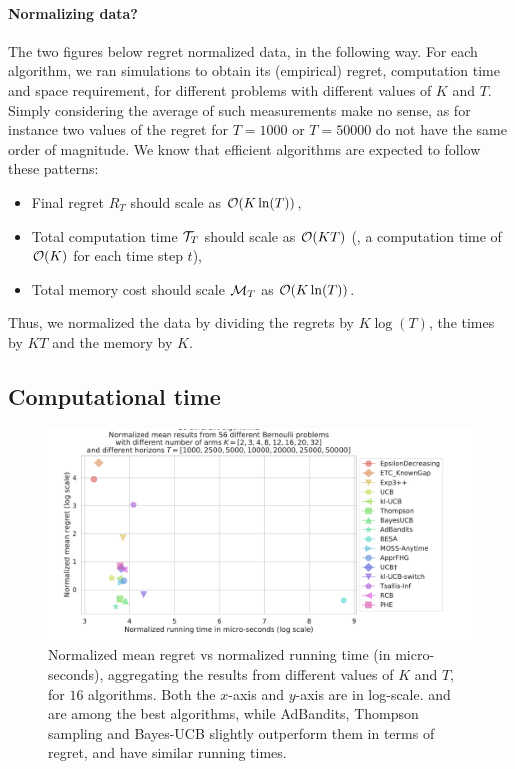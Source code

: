 \paragraph{Normalizing data?}

The two figures below regret normalized data, in the following way.
For each algorithm, we ran simulations to obtain its (empirical) regret, computation time and space requirement, for different problems with different values of $K$ and $T$.
Simply considering the average of such measurements make no sense, as for instance two values of the regret for $T=1000$ or $T=50000$ do not have the same order of magnitude.
%
We know that efficient algorithms are expected to follow these patterns:
\begin{itemize}
    \item Final regret $R_T$ should scale as $\mathcal{O}(K \ln(T))$,
    \item Total computation time $\mathcal{T}_T$ should scale as $\mathcal{O}(K T)$ (\ie, a computation time of $\mathcal{O}(K)$ for each time step $t$),
    \item Total memory cost should scale $\mathcal{M}_T$ as $\mathcal{O}(K \ln(T))$.
\end{itemize}
Thus, we normalized the data by dividing the regrets by $K \log(T)$, the times by $K T$ and the memory by $K$.


\subsection{Computational time}


\begin{figure}[h!]  %
	\includegraphics[width=1.05\linewidth]{16_different_algorithms__lognormregret_vs_lognormtime__56pb__7KS_7Ts.pdf}
	\caption[Normalized mean regret vs normalized running time (in micro-seconds).]{
        Normalized mean regret vs normalized running time (in micro-seconds),
        aggregating the results from different values of $K$ and $T$, for $16$ algorithms.
        Both the $x$-axis and $y$-axis are in log-scale.
        \UCB{} and \klUCB{} are among the best algorithms, while AdBandits, Thompson sampling and Bayes-UCB slightly outperform them in terms of regret, and have similar running times.
	}
	\label{fig:3:16_different_algorithms__lognormregret_vs_lognormtime__56pb__7KS_7Ts}
\end{figure}


